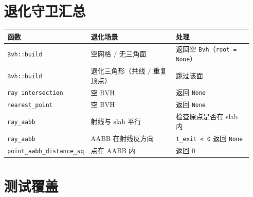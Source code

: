 \documentclass[11pt,a4paper]{article}
\begin{document}
\section{退化守卫汇总}

\begin{center}
\renewcommand{\arraystretch}{1.18}
\begin{tabular}{@{}lll@{}}
  \toprule
  \textbf{函数} & \textbf{退化场景} & \textbf{处理} \\
  \midrule
  \texttt{Bvh::build}            & 空网格 / 无三角面 & 返回空 \texttt{Bvh}（\texttt{root = None}） \\
  \texttt{Bvh::build}            & 退化三角形（共线 / 重复顶点） & 跳过该面 \\
  \texttt{ray\_intersection}     & 空 BVH & 返回 \texttt{None} \\
  \texttt{nearest\_point}        & 空 BVH & 返回 \texttt{None} \\
  \texttt{ray\_aabb}             & 射线与 slab 平行 & 检查原点是否在 slab 内 \\
  \texttt{ray\_aabb}             & AABB 在射线反方向 & \texttt{t\_exit < 0} 返回 \texttt{None} \\
  \texttt{point\_aabb\_distance\_sq} & 点在 AABB 内 & 返回 0 \\
  \bottomrule
\end{tabular}
\end{center}

\section{测试覆盖}
\end{document}

